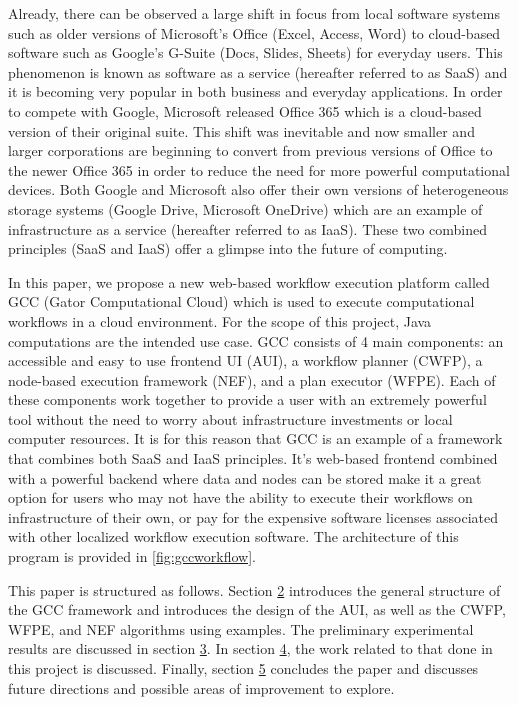 \documentclass[fleqn,10pt]{SelfArx} %
\begin{document}
Already, there can be observed a large shift in focus from local software systems such as older versions of Microsoft's Office (Excel, Access, Word) to cloud-based software such as Google's G-Suite (Docs, Slides, Sheets) for everyday users. This phenomenon is known as software as a service (hereafter referred to as SaaS) and it is becoming very popular in both business and everyday applications. In order to compete with Google, Microsoft released Office 365 which is a cloud-based version of their original suite. This shift was inevitable and now smaller \cite{kim2017analysis} and larger corporations are beginning to convert from previous versions of Office to the newer Office 365 \cite{skendzic2012microsoft} in order to reduce the need for more powerful computational devices. Both Google and Microsoft also offer their own versions of heterogeneous storage systems (Google Drive, Microsoft OneDrive) which are an example of infrastructure as a service (hereafter referred to as IaaS). These two combined principles (SaaS and IaaS) offer a glimpse into the future of computing.

In this paper, we propose a new web-based workflow execution platform called GCC (Gator Computational Cloud) which is used to execute computational workflows in a cloud environment. For the scope of this project, Java computations are the intended use case. GCC consists of 4 main components: an accessible and easy to use frontend UI (AUI), a workflow planner (CWFP), a node-based execution framework (NEF), and a plan executor (WFPE). Each of these components work together to provide a user with an extremely powerful tool without the need to worry about infrastructure investments or local computer resources. It is for this reason that GCC is an example of a framework that combines both SaaS and IaaS principles. It's web-based frontend combined with a powerful backend where data and nodes can be stored make it a great option for users who may not have the ability to execute their workflows on infrastructure of their own, or pay for the expensive software licenses associated with other localized workflow execution software. The architecture of this program is provided in \ref{fig:gccworkflow}.

This paper is structured as follows. Section \hyperref[sec:methods]{2} introduces the general structure of the GCC framework and introduces the design of the AUI, as well as the CWFP, WFPE, and NEF algorithms using examples. The preliminary experimental results are discussed in section \hyperref[sec:expresults]{3}. In section \hyperref[sec:relatedwork]{4}, the work related to that done in this project is discussed. Finally, section \hyperref[sec:conclusion]{5} concludes the paper and discusses future directions and possible areas of improvement to explore.
\end{document}
